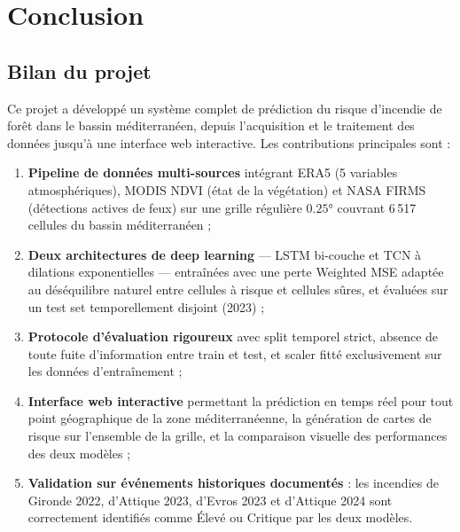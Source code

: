 \documentclass[12pt,a4paper]{report}
\begin{document}
\clearpage

\chapter{Conclusion}
\label{chap:conclusion}

\section{Bilan du projet}

Ce projet a développé un système complet de prédiction du risque d'incendie de forêt
dans le bassin méditerranéen, depuis l'acquisition et le traitement des données jusqu'à
une interface web interactive. Les contributions principales sont :

\begin{enumerate}[leftmargin=*,itemsep=6pt]
  \item \textbf{Pipeline de données multi-sources} intégrant ERA5 (5 variables
    atmosphériques), MODIS NDVI (état de la végétation) et NASA FIRMS (détections
    actives de feux) sur une grille régulière $0.25°$ couvrant 6\,517 cellules du
    bassin méditerranéen ;

  \item \textbf{Deux architectures de deep learning} — LSTM bi-couche et TCN à
    dilations exponentielles — entraînées avec une perte Weighted MSE adaptée au
    déséquilibre naturel entre cellules à risque et cellules sûres, et évaluées
    sur un test set temporellement disjoint (2023) ;

  \item \textbf{Protocole d'évaluation rigoureux} avec split temporel strict, absence
    de toute fuite d'information entre train et test, et scaler fitté exclusivement
    sur les données d'entraînement ;

  \item \textbf{Interface web interactive} permettant la prédiction en temps réel pour
    tout point géographique de la zone méditerranéenne, la génération de cartes de
    risque sur l'ensemble de la grille, et la comparaison visuelle des performances
    des deux modèles ;

  \item \textbf{Validation sur événements historiques documentés} : les incendies
    de Gironde 2022, d'Attique 2023, d'Evros 2023 et d'Attique 2024 sont correctement
    identifiés comme Élevé ou Critique par les deux modèles.
\end{enumerate}
\end{document}
